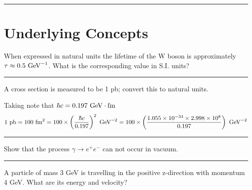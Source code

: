 \noindent\rule{7in}{2.8pt}
\section{Underlying Concepts}
\begin{problem}{2.1}
When expressed in natural units the lifetime of the W boson is approximately $\tau \approx 0.5\text{ GeV}^{-1}$. What is the corresponding value in S.I. units?
\end{problem}

\begin{solution}

\end{solution} 
\noindent\rule{7in}{1.5pt}


\begin{problem}{2.2}
A cross section is measured to be 1 pb; convert this to natural units.
\end{problem}

\begin{solution}
Taking note that $\hbar c = 0.197 \text{ GeV}\cdot\text{fm}$
\begin{align*}
    1 \text{ pb} = 100 \text{ fm}^2 = 100 \times \left( \frac{\hbar c }{0.197} \right)^2 \text{ GeV}^{-2} = 100 \times \left( \frac{\num{1.055e-34}\times\num{2.998e8}}{0.197} \right) \text{ GeV}^{-2}
\end{align*}
\end{solution} 
\noindent\rule{7in}{1.5pt}


\begin{problem}{2.3}
Show that the process $\gamma\to e^+ e^-$ can not occur in vacuum.
\end{problem}

\begin{solution}

\end{solution} 
\noindent\rule{7in}{1.5pt}


\begin{problem}{2.4}
A particle of mass 3 GeV is travelling in the positive z-direction with momentum 4 GeV. What are its energy and velocity?
\end{problem}

